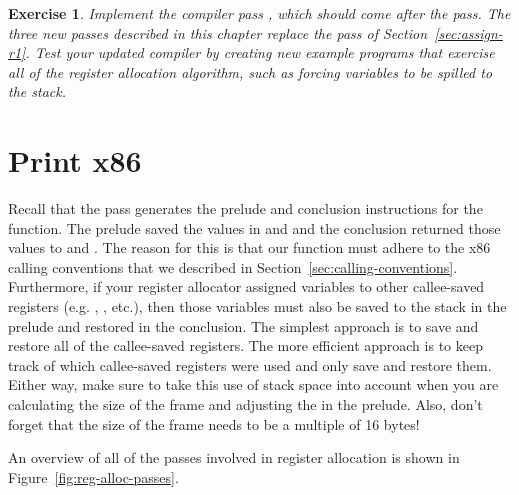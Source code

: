 \documentclass[11pt]{book}
\newtheorem{exercise}[theorem]{Exercise}
\begin{document}
\begin{exercise}\normalfont
  Implement the compiler pass , which should
  come after the  pass. The three new passes
  described in this chapter replace the  pass of
  Section~\ref{sec:assign-r1}.  
%  
  Test your updated compiler by creating new example programs that
  exercise all of the register allocation algorithm, such as forcing
  variables to be spilled to the stack.
\end{exercise}


\section{Print x86}
\label{sec:print-x86-reg-alloc}

Recall that the  pass generates the prelude and
conclusion instructions for the  function.
%
The prelude saved the values in  and  and the
conclusion returned those values to  and .  The
reason for this is that our  function must adhere to the
x86 calling conventions that we described in
Section~\ref{sec:calling-conventions}.  Furthermore, if your register
allocator assigned variables to other callee-saved registers
(e.g. , , etc.), then those variables must also be
saved to the stack in the prelude and restored in the conclusion.  The
simplest approach is to save and restore all of the callee-saved
registers. The more efficient approach is to keep track of which
callee-saved registers were used and only save and restore
them. Either way, make sure to take this use of stack space into
account when you are calculating the size of the frame and adjusting
the  in the prelude. Also, don't forget that the size of the
frame needs to be a multiple of 16 bytes!

An overview of all of the passes involved in register allocation is
shown in Figure~\ref{fig:reg-alloc-passes}.
\end{document}
